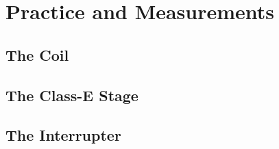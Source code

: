 \setchapterpreamble[u]{\margintoc}

\chapter{Practice and Measurements} %

\section{The Coil}

\section{The Class-E Stage}

\section{The Interrupter}